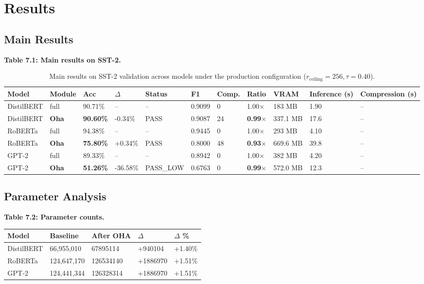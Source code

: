 
\section{Results}

\subsection{Main Results}

\textbf{Table 7.1: Main results on SST-2.}

\begin{table}[t]
\centering
\small
\begin{tabular}{lllllllllll}
\toprule
\textbf{Model} & \textbf{Module} & \textbf{Acc} & \textbf{$\Delta$} & \textbf{Status} & \textbf{F1} & \textbf{Comp.} & \textbf{Ratio} & \textbf{VRAM} & \textbf{Inference (s)} & \textbf{Compression (s)} \\
\midrule
DistilBERT & full & 90.71\% & -- & -- & 0.9099 & 0 & 1.00$\times$ & 183 MB & 1.90 & -- \\
DistilBERT & \textbf{Oha} & \textbf{90.60\%} & -0.34\% & PASS & 0.9087 & 24 & \textbf{0.99$\times$} & 337.1 MB & 17.6 & -- \\
RoBERTa & full & 94.38\% & -- & -- & 0.9445 & 0 & 1.00$\times$ & 293 MB & 4.10 & -- \\
RoBERTa & \textbf{Oha} & \textbf{75.80\%} & +0.34\% & PASS & 0.8000 & 48 & \textbf{0.93$\times$} & 669.6 MB & 39.8 & -- \\
GPT-2 & full & 89.33\% & -- & -- & 0.8942 & 0 & 1.00$\times$ & 382 MB & 4.20 & -- \\
GPT-2 & \textbf{Oha} & \textbf{51.26\%} & -36.58\% & PASS_LOW & 0.6763 & 0 & \textbf{0.99$\times$} & 572.0 MB & 12.3 & -- \\
\bottomrule
\end{tabular}
\caption{Main results on SST-2 validation across models under the production configuration ($r_{\mathrm{ceiling}}=256, \tau=0.40$).}
\label{tab:main_sst2}
\end{table}

\subsection{Parameter Analysis}

\textbf{Table 7.2: Parameter counts.}

\begin{table}[H]
\centering
\small
\begin{tabular}{lllll}
\toprule
\textbf{Model} & \textbf{Baseline} & \textbf{After OHA} & \textbf{$\Delta$} & \textbf{$\Delta$ \%} \\
\midrule
DistilBERT & 66,955,010 & 67895114 & +940104 & +1.40\% \\
RoBERTa & 124,647,170 & 126534140 & +1886970 & +1.51\% \\
GPT-2 & 124,441,344 & 126328314 & +1886970 & +1.51\% \\
\bottomrule
\end{tabular}
\end{table}

